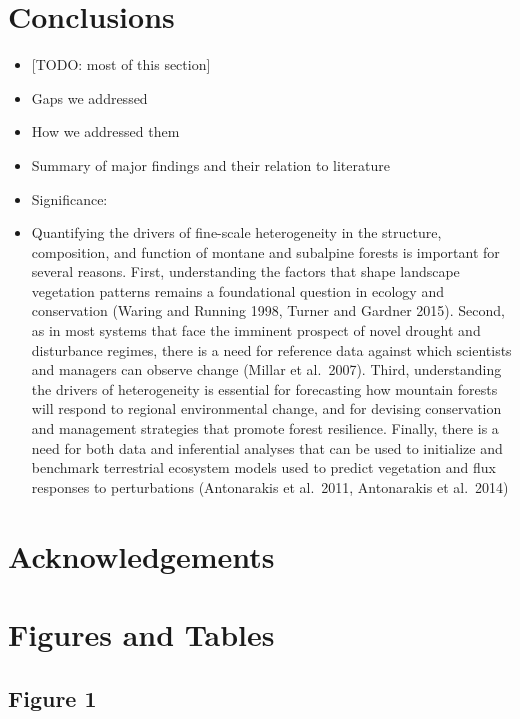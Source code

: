 \documentclass[
  12pt,
]{article}
\providecommand{\tightlist}{%
  \setlength{\itemsep}{0pt}\setlength{\parskip}{0pt}}
\begin{document}
\section{Conclusions}\label{conclusions}

\begin{itemize}
\tightlist
\item
  {[}TODO: most of this section{]}
\item
  Gaps we addressed
\item
  How we addressed them
\item
  Summary of major findings and their relation to literature
\item
  Significance:
\item
  Quantifying the drivers of fine-scale heterogeneity in the structure,
  composition, and function of montane and subalpine forests is
  important for several reasons. First, understanding the factors that
  shape landscape vegetation patterns remains a foundational question in
  ecology and conservation (Waring and Running 1998, Turner and Gardner
  2015). Second, as in most systems that face the imminent prospect of
  novel drought and disturbance regimes, there is a need for reference
  data against which scientists and managers can observe change (Millar
  et al.~2007). Third, understanding the drivers of heterogeneity is
  essential for forecasting how mountain forests will respond to
  regional environmental change, and for devising conservation and
  management strategies that promote forest resilience. Finally, there
  is a need for both data and inferential analyses that can be used to
  initialize and benchmark terrestrial ecosystem models used to predict
  vegetation and flux responses to perturbations (Antonarakis et
  al.~2011, Antonarakis et al.~2014)
\end{itemize}

\section{Acknowledgements}\label{acknowledgements}

\clearpage

\newpage

\section{Figures and Tables}\label{figures-and-tables}

\subsection{Figure 1}\label{figure-1}
\end{document}
